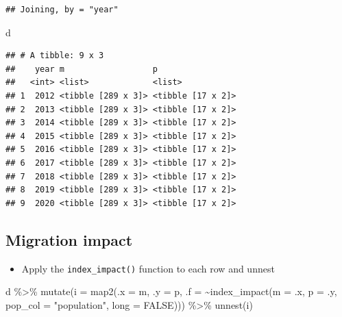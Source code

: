 \documentclass[
]{book}
\newenvironment{Shaded}{\begin{snugshade}}{\end{snugshade}}
\newcommand{\AttributeTok}[1]{\textcolor[rgb]{0.77,0.63,0.00}{#1}}
\newcommand{\ConstantTok}[1]{\textcolor[rgb]{0.00,0.00,0.00}{#1}}
\newcommand{\FunctionTok}[1]{\textcolor[rgb]{0.00,0.00,0.00}{#1}}
\newcommand{\NormalTok}[1]{#1}
\newcommand{\SpecialCharTok}[1]{\textcolor[rgb]{0.00,0.00,0.00}{#1}}
\newcommand{\StringTok}[1]{\textcolor[rgb]{0.31,0.60,0.02}{#1}}
\providecommand{\tightlist}{%
  \setlength{\itemsep}{0pt}\setlength{\parskip}{0pt}}
\begin{document}
\begin{verbatim}
## Joining, by = "year"
\end{verbatim}

\begin{Shaded}
\begin{Highlighting}[]
\NormalTok{d}
\end{Highlighting}
\end{Shaded}

\begin{verbatim}
## # A tibble: 9 x 3
##    year m                  p                
##   <int> <list>             <list>           
## 1  2012 <tibble [289 x 3]> <tibble [17 x 2]>
## 2  2013 <tibble [289 x 3]> <tibble [17 x 2]>
## 3  2014 <tibble [289 x 3]> <tibble [17 x 2]>
## 4  2015 <tibble [289 x 3]> <tibble [17 x 2]>
## 5  2016 <tibble [289 x 3]> <tibble [17 x 2]>
## 6  2017 <tibble [289 x 3]> <tibble [17 x 2]>
## 7  2018 <tibble [289 x 3]> <tibble [17 x 2]>
## 8  2019 <tibble [289 x 3]> <tibble [17 x 2]>
## 9  2020 <tibble [289 x 3]> <tibble [17 x 2]>
\end{verbatim}

\hypertarget{migration-impact-3}{%
\subsection{Migration impact}\label{migration-impact-3}}

\begin{itemize}
\tightlist
\item
  Apply the \texttt{index\_impact()} function to each row and unnest
\end{itemize}

\begin{Shaded}
\begin{Highlighting}[]
\NormalTok{d }\SpecialCharTok{\%\textgreater{}\%}
  \FunctionTok{mutate}\NormalTok{(}\AttributeTok{i =} \FunctionTok{map2}\NormalTok{(}\AttributeTok{.x =}\NormalTok{ m, }\AttributeTok{.y =}\NormalTok{ p, }
                  \AttributeTok{.f =} \SpecialCharTok{\textasciitilde{}}\FunctionTok{index\_impact}\NormalTok{(}\AttributeTok{m =}\NormalTok{ .x, }\AttributeTok{p =}\NormalTok{ .y, }
                                     \AttributeTok{pop\_col =} \StringTok{"population"}\NormalTok{,}
                                     \AttributeTok{long =} \ConstantTok{FALSE}\NormalTok{))) }\SpecialCharTok{\%\textgreater{}\%}
  \FunctionTok{unnest}\NormalTok{(i)}
\end{Highlighting}
\end{Shaded}
\end{document}

